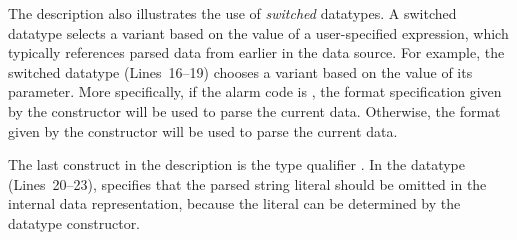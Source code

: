 The \darkstar{} description also illustrates the use of
\textit{switched} datatypes.  A switched datatype selects a variant
based on the value of a user-specified \ocaml{} expression, which
typically references parsed data from earlier in the data source.  For
example, the switched datatype  (Lines~16--19) chooses a
variant based on the value of its  parameter.  More
specifically, if the alarm code is , the format specification
given by the  constructor will be used to parse the
current data.  Otherwise, the format given by the 
constructor will be used to parse the current data.

The last construct in the \darkstar{} description is the type
qualifier .  In the  datatype (Lines~20--23),
 specifies that the parsed string literal should be omitted
in the internal data representation, because the literal can be
determined by the datatype constructor.


